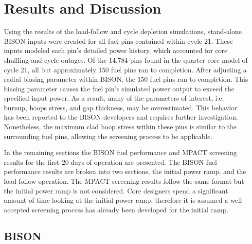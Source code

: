 \documentclass[edeposit,fullpage,11pt]{uiucthesis2009}
\begin{document}



\chapter{Results and Discussion}
Using the results of the load-follow and  cycle depletion simulations, stand-alone BISON inputs were created for all fuel pins contained within cycle 21. 
These inputs modeled each pin's detailed power history, which accounted for core shuffling and cycle outages. 
Of the 14,784 pins found in the quarter core model of cycle 21, all but approximately 150 fuel pins ran to completion.
After adjusting a radial biasing parameter within BISON, the 150 fuel pins ran to completion.
This biasing parameter causes the fuel pin's simulated power output to exceed the specified input power.
As a result, many of the parameters of interest, i.e. burnup, hoops stress, and gap thickness, may be overestimated.
This behavior has been reported to the BISON developers and requires further investigation. 
Nonetheless, the maximum clad hoop stress within these pins is similar to the surrounding fuel pins, allowing the screening process to be applicable.

In the remaining sections the BISON fuel performance and MPACT screening results for the first 20 days of operation are presented.
The BISON fuel performance results are broken into two sections, the initial power ramp, and the load-follow operation.
The MPACT screening results follow the same format but the initial power ramp is not considered. 
Core designers spend a significant amount of time looking at the initial power ramp, therefore it is assumed a well accepted screening process has already been developed for the initial ramp.

\section{BISON}
\end{document}
